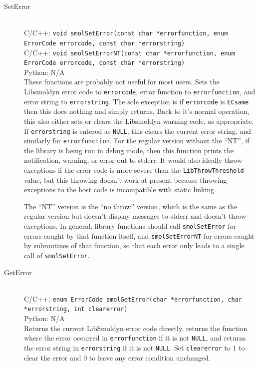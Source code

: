 \documentclass {book}
\newcommand {\ttt} {\texttt}
\begin{document}
\begin{description}

\item[SetError]
\hfill \\
C/C++: \ttt{void smolSetError(const char *errorfunction, enum ErrorCode errorcode, const char *errorstring)}\\
C/C++: \ttt{void smolSetErrorNT(const char *errorfunction, enum ErrorCode errorcode, const char *errorstring)}\\
Python: N/A\\
These functions are probably not useful for most users. Sets the Libsmoldyn error code to \ttt{errorcode}, error function to \ttt{errorfunction}, and error string to \ttt{errorstring}. The sole exception is if \ttt{errorcode} is \ttt{ECsame} then this does nothing and simply returns. Back to it's normal operation, this also either sets or clears the Libsmoldyn warning code, as appropriate. If \ttt{errorstring} is entered as \ttt{NULL}, this clears the current error string, and similarly for \ttt{errorfunction}. For the regular version without the ``NT'', if the library is being run in debug mode, then this function prints the notification, warning, or error out to stderr. It would also ideally throw exceptions if the error code is more severe than the \ttt{LibThrowThreshold} value, but this throwing doesn't work at present because throwing exceptions to the host code is incompatible with static linking.

The ``NT'' version is the ``no throw'' version, which is the same as the regular version but doesn't display messages to stderr and doesn't throw exceptions. In general, library functions should call \ttt{smolSetError} for errors caught by that function itself, and \ttt{smolSetErrorNT} for errors caught by subroutines of that function, so that each error only leads to a single call of \ttt{smolSetError}.

\item[GetError]
\hfill \\
C/C++: \ttt{enum ErrorCode smolGetError(char *errorfunction, char *errorstring, int clearerror)}\\
Python: N/A\\
Returns the current LibSmoldyn error code directly, returns the function where the error occurred in \ttt{errorfunction} if it is not \ttt{NULL}, and returns the error string in \ttt{errorstring} if it is not \ttt{NULL}. Set \ttt{clearerror} to 1 to clear the error and 0 to leave any error condition unchanged.


\end{description}
\end{document}
